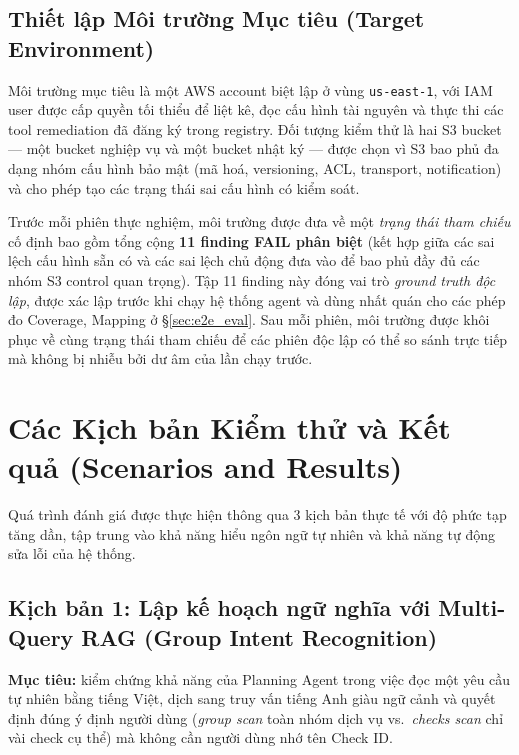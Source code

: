 \subsection{Thiết lập Môi trường Mục tiêu (Target Environment)}
\label{subsec:target_environment}

Môi trường mục tiêu là một AWS account biệt lập ở vùng \texttt{us-east-1}, với IAM user được cấp quyền tối thiểu để liệt kê, đọc cấu hình tài nguyên và thực thi các tool remediation đã đăng ký trong registry. Đối tượng kiểm thử là hai S3 bucket --- một bucket nghiệp vụ và một bucket nhật ký --- được chọn vì S3 bao phủ đa dạng nhóm cấu hình bảo mật (mã hoá, versioning, ACL, transport, notification) và cho phép tạo các trạng thái sai cấu hình có kiểm soát.

Trước mỗi phiên thực nghiệm, môi trường được đưa về một \emph{trạng thái tham chiếu} cố định bao gồm tổng cộng \textbf{11 finding FAIL phân biệt} (kết hợp giữa các sai lệch cấu hình sẵn có và các sai lệch chủ động đưa vào để bao phủ đầy đủ các nhóm S3 control quan trọng). Tập 11 finding này đóng vai trò \emph{ground truth độc lập}, được xác lập trước khi chạy hệ thống agent và dùng nhất quán cho các phép đo Coverage, Mapping ở \S\ref{sec:e2e_eval}. Sau mỗi phiên, môi trường được khôi phục về cùng trạng thái tham chiếu để các phiên độc lập có thể so sánh trực tiếp mà không bị nhiễu bởi dư âm của lần chạy trước.

\section{Các Kịch bản Kiểm thử và Kết quả (Scenarios and Results)}
\label{sec:eval_scenarios}

Quá trình đánh giá được thực hiện thông qua 3 kịch bản thực tế với độ phức tạp tăng dần, tập trung vào khả năng hiểu ngôn ngữ tự nhiên và khả năng tự động sửa lỗi của hệ thống.

\subsection{Kịch bản 1: Lập kế hoạch ngữ nghĩa với Multi-Query RAG (Group Intent Recognition)}
\label{subsec:scenario_planning}
\textbf{Mục tiêu:} kiểm chứng khả năng của Planning Agent trong việc đọc một yêu cầu tự nhiên bằng tiếng Việt, dịch sang truy vấn tiếng Anh giàu ngữ cảnh và quyết định đúng ý định người dùng (\textit{group scan} toàn nhóm dịch vụ vs.\ \textit{checks scan} chỉ vài check cụ thể) mà không cần người dùng nhớ tên Check ID.

